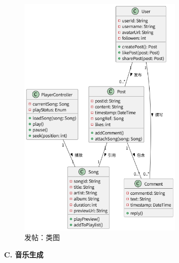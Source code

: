 \documentclass{base}
\numberwithin{figure}{section} %
\begin{document}
\begin{figure}[H]
    \centering
    \includegraphics[width=0.7\textwidth]{images/post-2.png}
    \caption{发帖：类图}
\end{figure}

\textbf{C. 音乐生成}
\end{document}

